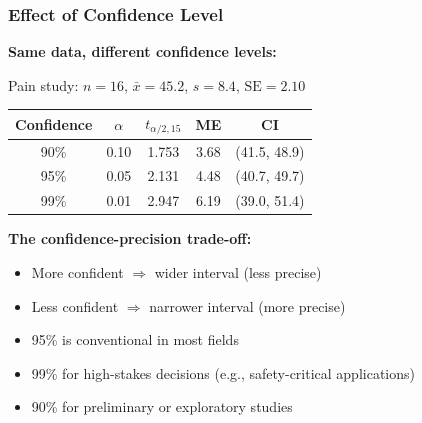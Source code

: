\documentclass{beamer}
\begin{document}
\begin{frame}
\frametitle{Effect of Confidence Level}
\textbf{Same data, different confidence levels:}

\vspace{0.3cm}
Pain study: $n = 16$, $\bar{x} = 45.2$, $s = 8.4$, $\text{SE} = 2.10$

\vspace{0.3cm}
\begin{center}
\begin{tabular}{ccccc}
\toprule
Confidence & $\alpha$ & $t_{\alpha/2, 15}$ & ME & CI \\
\midrule
90\% & 0.10 & 1.753 & 3.68 & (41.5, 48.9) \\
95\% & 0.05 & 2.131 & 4.48 & (40.7, 49.7) \\
99\% & 0.01 & 2.947 & 6.19 & (39.0, 51.4) \\
\bottomrule
\end{tabular}
\end{center}

\vspace{0.5cm}
\textbf{The confidence-precision trade-off:}
\begin{itemize}
\item More confident $\Rightarrow$ wider interval (less precise)
\item Less confident $\Rightarrow$ narrower interval (more precise)
\item 95\% is conventional in most fields
\item 99\% for high-stakes decisions (e.g., safety-critical applications)
\item 90\% for preliminary or exploratory studies
\end{itemize}
\end{frame}
\end{document}
